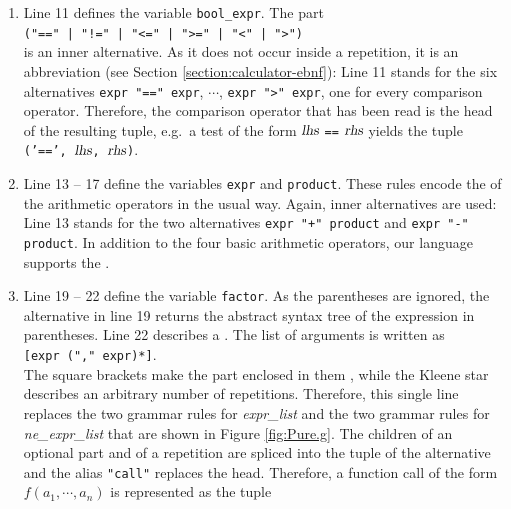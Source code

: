 \begin{enumerate}
      replaces the head, so an expression statement is represented as \texttt{('expr', $\textsl{expr}$)}.
      Note that an alias may be written with or without double quotes.
\item Line 11 defines the variable \texttt{bool\_expr}.  The part
      \\[0.2cm]
      \hspace*{1.3cm}
      \verb+("==" | "!=" | "<=" | ">=" | "<" | ">")+
      \\[0.2cm]
      is an inner alternative.  As it does not occur inside a repetition, it is an abbreviation (see
      Section \ref{section:calculator-ebnf}):  Line 11 stands for
      the six alternatives \texttt{expr "==" expr}, $\cdots$, \texttt{expr ">" expr}, one for every
      comparison operator.  Therefore, the comparison operator that has been read is the head of the
      resulting tuple, e.g.~a test of the form $\textsl{lhs}$ \texttt{==} $\textsl{rhs}$ yields the tuple
      \texttt{('==', $\textsl{lhs}$, $\textsl{rhs}$)}.
\item Line 13 -- 17 define the variables \texttt{expr} and \texttt{product}.  These rules encode the
       of the arithmetic operators in the usual way.  Again, inner alternatives are used:
      Line 13 stands for the two alternatives \texttt{expr "+" product} and \texttt{expr "-" product}.  In
      addition to the four basic arithmetic operators, our language supports the
       \squoted{\%}.
\item Line 19 -- 22 define the variable \texttt{factor}.  As the parentheses are ignored, the alternative in
      line 19 returns the abstract syntax tree of the expression in parentheses.  Line 22 describes a
      .  The list of arguments is written as
      \\[0.2cm]
      \hspace*{1.3cm}
      \texttt{[expr ("," expr)*]}.
      \\[0.2cm]
      The square brackets make the part enclosed in them , while the Kleene star describes an
      arbitrary number of repetitions.  Therefore, this single line replaces the two grammar rules for
      \textsl{expr\_list} and the two grammar rules for \textsl{ne\_expr\_list} that are shown in Figure
      \ref{fig:Pure.g}.  The children of an optional part and of a repetition are spliced into the tuple
      of the alternative and the alias \texttt{"call"} replaces the head.  Therefore, a function call of the
      form $f(a_1, \cdots\!, a_n)$ is represented as the tuple

\end{enumerate}
